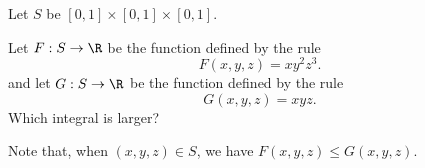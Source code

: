\documentclass{ximera}
\author{Jim Fowler}
\begin{document}
\begin{exercise}
  Let $S$ be $[0,1] \times [0,1] \times [0,1]$.
  
  Let $F : S \to \R$ be the function defined by the rule
  \[
    F(x,y,z) = x y^2 z^3.
  \]
  and let $G : S \to \R$ be the function defined by the rule
  \[
    G(x,y,z) = x y z.
  \]
  Which integral is larger?
  \begin{multipleChoice}
  \end{multipleChoice}
  
  \begin{hint}
    Note that, when $(x,y,z) \in S$, we have $F(x,y,z) \leq G(x,y,z)$.
  \end{hint}
  
\end{exercise}
\end{document}
